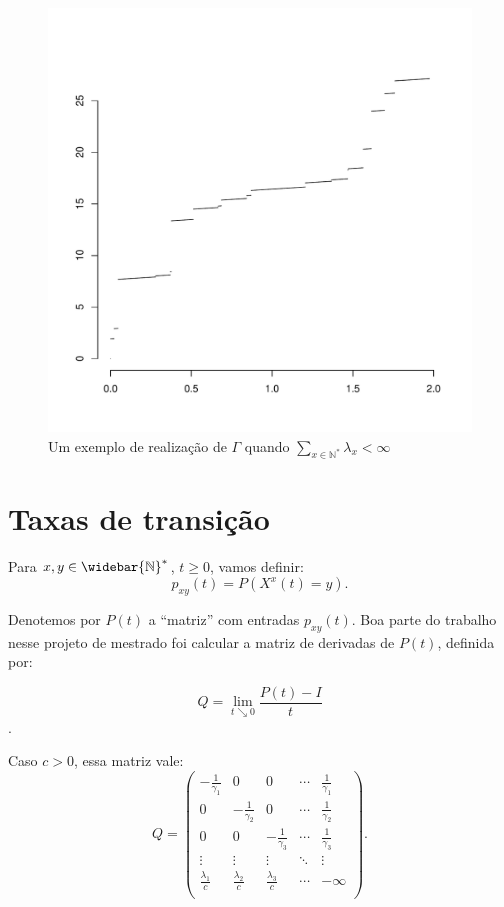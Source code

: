 \documentclass[11pt,twoside,a4paper]{article}
\newcommand{\Nz}{{\mathbb{N^*}}}
\newcommand{\Nzb}{{\mathbb{\widebar{N}^*}}}
\begin{document}
\begin{figure}
  \centering
  \includegraphics[width=.80\textwidth]{graf_gamma}
  \caption{Um exemplo de realização de $\Gamma$ quando $\sum_{x \in
      \Nz} \lambda_x < \infty$}
  \label{fig:graf_gamma}
\end{figure}


\section{Taxas de transição}

Para $x, y \in \Nzb$, $t \geq 0$, vamos definir:
\begin{equation}
  p_{xy} (t) = P(X^x(t) = y).
\end{equation}

Denotemos por $P(t)$ a ``matriz'' com entradas $p_{x y}(t)$. Boa
parte do trabalho nesse projeto de mestrado foi calcular a matriz de
derivadas de $P(t)$, definida por:

\begin{displaymath}
  Q = \lim_{t \searrow 0} \frac{P(t) - I}{t} 
\end{displaymath}.

Caso $c > 0$, essa matriz vale:
\begin{displaymath}
  Q = \left(
    \begin{array}{ccccc}
      -\frac{1}{\gamma_1} & 0 & 0 & \cdots & \frac{1}{\gamma_1}\\
      0 & -\frac{1}{\gamma_2} & 0 & \cdots & \frac{1}{\gamma_2}\\
      0 & 0 & -\frac{1}{\gamma_3} & \cdots & \frac{1}{\gamma_3}\\
      \vdots & \vdots & \vdots & \ddots & \vdots \\
      \frac{\lambda_1}{c} & \frac{\lambda_2}{c} &
      \frac{\lambda_3}{c} & \cdots & -\infty\\
    \end{array}
  \right).
\end{displaymath}
\end{document}
